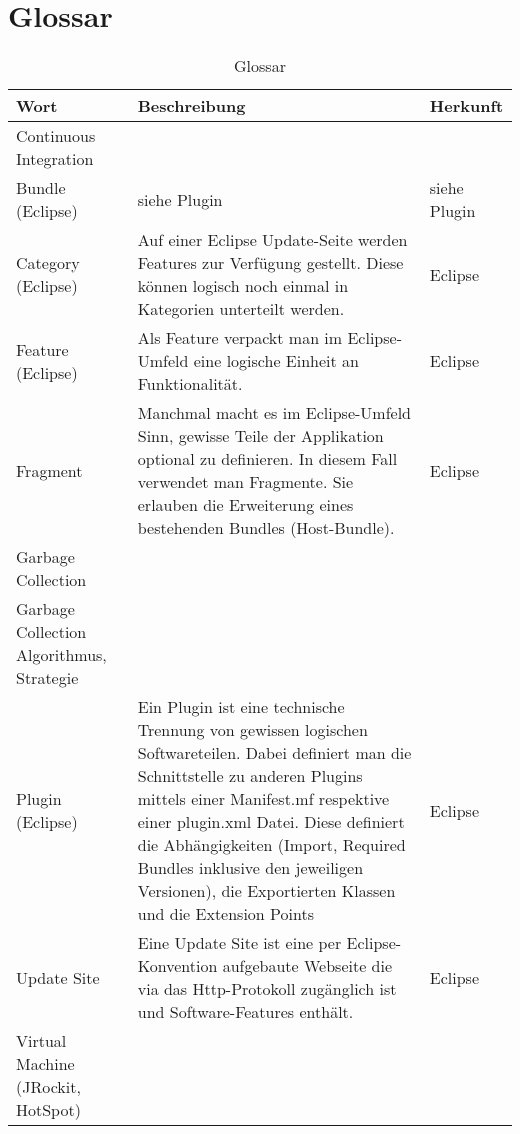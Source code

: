 \chapter*{Glossar}\label{glossar}
  \begin{longtable}{|p{5cm}|p{6cm}|p{3cm}|}
      \caption{Glossar}\\
\hline
  \textbf{Wort} & \textbf{Beschreibung} & \textbf{Herkunft}\\\hline
  Continuous Integration  &&\\\hline
  Bundle (Eclipse) & siehe Plugin & siehe Plugin\\\hline
  Category (Eclipse) & Auf einer Eclipse Update-Seite werden Features zur Verfügung gestellt. Diese können logisch noch einmal in Kategorien unterteilt werden. & Eclipse\\\hline
  Feature (Eclipse) & Als Feature verpackt man im Eclipse-Umfeld eine logische Einheit an Funktionalität. & Eclipse\\\hline
  Fragment & Manchmal macht es im Eclipse-Umfeld Sinn, gewisse Teile der Applikation optional zu definieren. In diesem Fall verwendet man Fragmente. Sie erlauben die Erweiterung eines bestehenden Bundles (Host-Bundle). & Eclipse\\\hline
  Garbage Collection & & \\\hline
  Garbage Collection Algorithmus, Strategie & & \\\hline
  Plugin (Eclipse) & Ein Plugin ist eine technische Trennung von gewissen logischen Softwareteilen. Dabei definiert man die Schnittstelle zu anderen Plugins mittels einer Manifest.mf respektive einer plugin.xml Datei. Diese definiert die Abhängigkeiten (Import, Required Bundles inklusive den jeweiligen Versionen), die Exportierten Klassen und die Extension Points  & Eclipse\\\hline
  Update Site & Eine Update Site ist eine per Eclipse-Konvention aufgebaute Webseite die via das Http-Protokoll zugänglich ist und Software-Features enthält.& Eclipse\\\hline
  Virtual Machine (JRockit, HotSpot) & & \\\hline
  \end{longtable}


